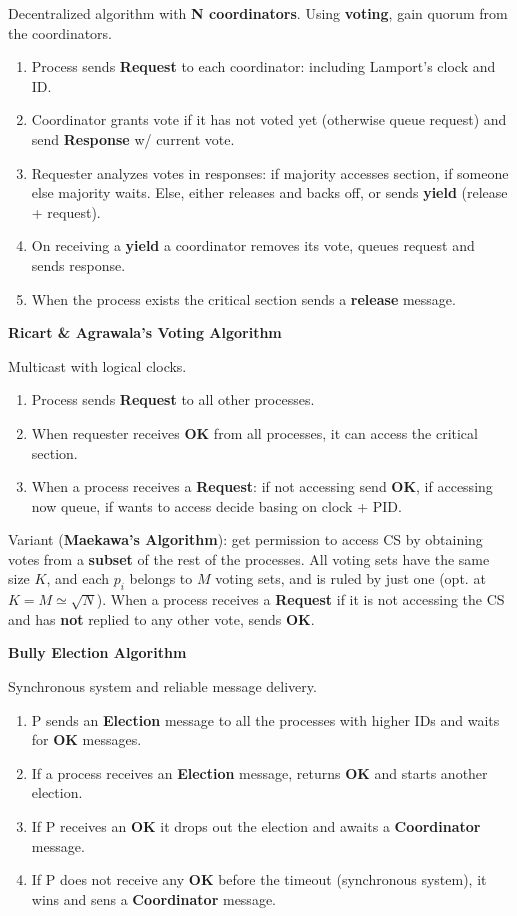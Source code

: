 \documentclass[a4paper, 10pt, twocolumn]{article}
\begin{document}
    Decentralized algorithm with \textbf{N coordinators}.
    Using \textbf{voting}, gain quorum from the coordinators.
    \begin{enumerate}
        \item Process sends \textbf{Request} to each coordinator: including Lamport's clock and ID.
        \item Coordinator grants vote if it has not voted yet (otherwise queue request) and send \textbf{Response} w/ current vote.
        \item Requester analyzes votes in responses: if majority accesses section, if someone else majority waits. Else, either releases and backs off, or sends \textbf{yield} (release + request).
        \item On receiving a \textbf{yield} a coordinator removes its vote, queues request and sends response.
        \item When the process exists the critical section sends a \textbf{release} message.
    \end{enumerate}

    \textbf{Ricart \& Agrawala's Voting Algorithm}

    Multicast with logical clocks.
    \begin{enumerate}
        \item Process sends \textbf{Request} to all other processes.
        \item When requester receives \textbf{OK} from all processes, it can access the critical section.
        \item When a process receives a \textbf{Request}: if not accessing send \textbf{OK}, if accessing now queue, if wants to access decide basing on clock + PID.
    \end{enumerate}
    Variant (\textbf{Maekawa's Algorithm}): get permission to access CS by obtaining votes from a \textbf{subset} of the rest of the processes.
    All voting sets have the same size $K$, and each $p_i$ belongs to $M$ voting sets, and is ruled by just one (opt. at $K = M \simeq \sqrt{N}$).
    When a process receives a \textbf{Request} if it is not accessing the CS and has \textbf{not} replied to any other vote, sends \textbf{OK}.

    \textbf{Bully Election Algorithm}

    Synchronous system and reliable message delivery.
    \begin{enumerate}
        \item P sends an \textbf{Election} message to all the processes with higher IDs and waits for \textbf{OK} messages.
        \item If a process receives an \textbf{Election} message, returns \textbf{OK} and starts another election.
        \item If P receives an \textbf{OK} it drops out the election and awaits a \textbf{Coordinator} message.
        \item If P does not receive any \textbf{OK} before the timeout (synchronous system), it wins and sens a \textbf{Coordinator} message.
    \end{enumerate}
\end{document}
